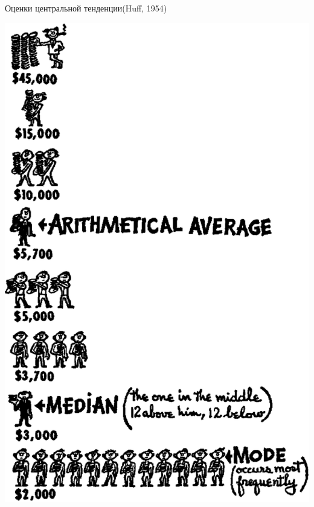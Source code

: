 \documentclass[11pt,pdf,utf8,hyperref={unicode},aspectratio=169]{beamer}
\begin{document}
\begin{frame}{Оценки центральной тенденции}{(Huff, 1954)}
\begin{multicols}{2}
\begin{center}
        \includegraphics[height=0.85\textheight]{howto.png}
    \end{center}
    \end{multicols}

\end{frame}
\end{document}
